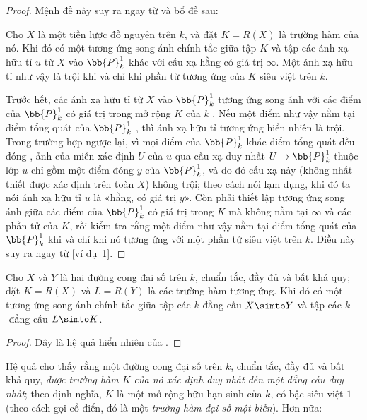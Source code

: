 \documentclass[oneside,10pt]{amsart}
\makeatletter
\newcommand{\ega@arrow}[2]{\mathchoice{#1}{#2}{#2}{#2}}
\renewcommand{\to}{\ega@arrow{\longrightarrow}{\rightarrow}}
\newcommand{\oldpage}[2][]{\marginnote{\normalfont\footnotesize\textbf{#1}~|~#2}\ignorespaces}
\let\EGAOriginalLabel\label
\renewcommand{\label}[1]{\phantomsection\EGAOriginalLabel{#1}}
\makeatother
\begin{document}
\begin{proof}
Mệnh đề này suy ra ngay từ  và bổ đề sau:
\begin{lemma}[7.4.15.1]
\label{II.7.4.15.1}
Cho $X$ là một tiền lược đồ nguyên trên $k$, và đặt $K=R(X)$ là trường hàm của nó.
Khi đó có một tương ứng song ánh chính tắc giữa tập $K$ và tập các ánh xạ hữu tỉ $u$ từ $X$ vào $\bb{P}_k^1$ khác với cấu xạ hằng có giá trị $\infty$.
Một ánh xạ hữu tỉ như vậy là trội khi và chỉ khi phần tử tương ứng của $K$ siêu việt trên $k$.
\end{lemma}
Trước hết, các ánh xạ hữu tỉ từ $X$ vào $\bb{P}_k^1$ tương ứng song ánh với các điểm của $\bb{P}_k^1$ có giá trị trong mở rộng $K$ của $k$ .
Nếu một điểm như vậy nằm tại điểm tổng quát của $\bb{P}_k^1$ , thì ánh xạ hữu tỉ tương ứng hiển nhiên là trội.
Trong trường hợp ngược lại, vì mọi điểm của $\bb{P}_k^1$ khác điểm tổng quát đều đóng , ảnh của miền xác định $U$ của $u$ qua cấu xạ duy nhất $U\to\bb{P}_k^1$ thuộc lớp $u$  chỉ gồm một điểm đóng $y$ của $\bb{P}_k^1$, và do đó cấu xạ này (không nhất thiết được xác định trên toàn $X$) không trội;
theo cách nói lạm dụng, khi đó ta nói ánh xạ hữu tỉ $u$ là «hằng, có giá trị $y$».
Còn phải thiết lập tương ứng song ánh giữa các điểm của $\bb{P}_k^1$ có giá trị trong $K$ mà không nằm tại $\infty$  và các phần tử của $K$, rồi kiểm tra rằng một điểm như vậy nằm tại điểm tổng quát của $\bb{P}_k^1$ khi và chỉ khi nó tương ứng với một
\oldpage[II]{152}
phần tử siêu việt trên $k$.
Điều này suy ra ngay từ [ví dụ~1].
\end{proof}

\begin{corollary}[7.4.16]
\label{II.7.4.16}
Cho $X$ và $Y$ là hai đường cong đại số trên $k$, chuẩn tắc, đầy đủ và bất khả quy;
đặt $K=R(X)$ và $L=R(Y)$ là các trường hàm tương ứng.
Khi đó có một tương ứng song ánh chính tắc giữa tập các $k$-đẳng cấu $X\simto Y$ và tập các $k$-đẳng cấu $L\simto K$.
\end{corollary}

\begin{proof}
Đây là hệ quả hiển nhiên của .
\end{proof}

\begin{env}[7.4.17]
\label{II.7.4.17}
Hệ quả  cho thấy rằng một đường cong đại số trên $k$, chuẩn tắc, đầy đủ và bất khả quy, \emph{được trường hàm $K$ của nó xác định duy nhất đến một đẳng cấu duy nhất};
theo định nghĩa, $K$ là một mở rộng hữu hạn sinh của $k$, có bậc siêu việt $1$ (theo cách gọi cổ điển, đó là một \emph{trường hàm đại số một biến}).
Hơn nữa:
\end{env}
\end{document}
